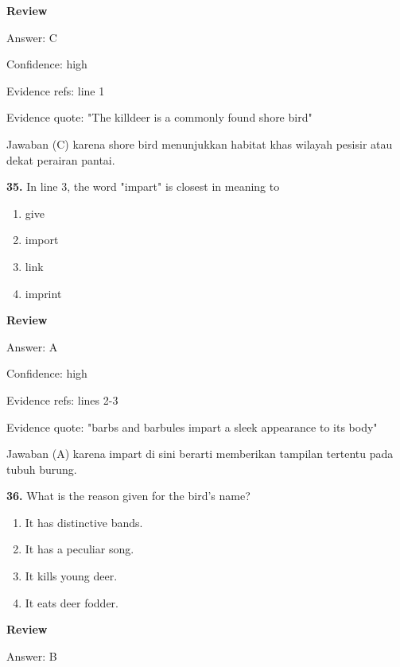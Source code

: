 \documentclass[12pt]{article}
\begin{document}
\par
\begingroup
\setlength{\parskip}{0pt}
\setlength{\parindent}{0pt}
\textbf{Review}\par
Answer: C\par
Confidence: high\par
Evidence refs: line 1\par
Evidence quote: "The killdeer is a commonly found shore bird"\par
Jawaban (C) karena shore bird menunjukkan habitat khas wilayah pesisir atau dekat perairan pantai.\par
\endgroup
\par
\vspace{0.25\baselineskip}
\noindent\textbf{35.} In line 3, the word "impart" is closest in meaning to
\begin{enumerate}[label=(\Alph*),leftmargin=*,itemsep=0.2em]
\item give
\item import
\item link
\item imprint
\end{enumerate}
\par
\begingroup
\setlength{\parskip}{0pt}
\setlength{\parindent}{0pt}
\textbf{Review}\par
Answer: A\par
Confidence: high\par
Evidence refs: lines 2-3\par
Evidence quote: "barbs and barbules impart a sleek appearance to its body"\par
Jawaban (A) karena impart di sini berarti memberikan tampilan tertentu pada tubuh burung.\par
\endgroup
\par
\vspace{0.25\baselineskip}
\noindent\textbf{36.} What is the reason given for the bird's name?
\begin{enumerate}[label=(\Alph*),leftmargin=*,itemsep=0.2em]
\item It has distinctive bands.
\item It has a peculiar song.
\item It kills young deer.
\item It eats deer fodder.
\end{enumerate}
\par
\begingroup
\setlength{\parskip}{0pt}
\setlength{\parindent}{0pt}
\textbf{Review}\par
Answer: B\par
\end{document}
